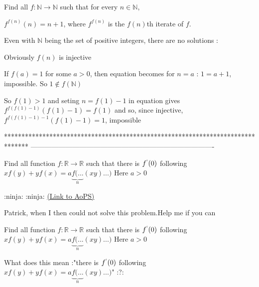 \begin{solution}
	\begin{tcolorbox}Find all $f: \mathbb{N}\rightarrow \mathbb{N}$ such that for every $n\in \mathbb{N}$,

$f^{f(n)}(n)=n+1$, where $f^{f(n)}$ is the $f(n)$th iterate of $f$.\end{tcolorbox}
Even with $\mathbb N$ being the set of positive integers, there are no solutions :

Obviously $f(n)$ is injective

If $f(a)=1$ for some $a>0$, then equation becomes for $n=a$ : $1=a+1$, impossible. So $1\notin f(\mathbb N)$

So $f(1)>1$ and seting $n=f(1)-1$ in equation gives $f^{f(f(1)-1)}(f(1)-1)=f(1)$ and so, since injective, $f^{f(f(1)-1)-1}(f(1)-1)=1$, impossible
\end{solution}
*******************************************************************************
-------------------------------------------------------------------------------

\begin{problem}
	Find all function $ f: \mathbb{R}\to\mathbb{R}$ such that there is $ f^{`}(0)$ following   $ xf(y)+yf(x)=a\underbrace {f( ...}_{n}(xy)...)$  Here  $ a>0$   



 :ninja:  :ninja:
	\flushright \href{https://artofproblemsolving.com/community/c6h322678}{(Link to AoPS)}
\end{problem}



\begin{solution}
	Patrick, when I then could not solve this problem.Help me if you can
\end{solution}



\begin{solution}
	\begin{tcolorbox}Find all function $ f: \mathbb{R}\to\mathbb{R}$ such that there is $ f^{`}(0)$ following   $ xf(y)+yf(x)=a\underbrace {f( ...}_{n}(xy)...)$  Here  $ a>0$  \end{tcolorbox}

What does this mean :"there is $ f^{`}(0)$ following   $ xf(y)+yf(x)=a\underbrace {f( ...}_{n}(xy)...)$" :?:
\end{solution}



